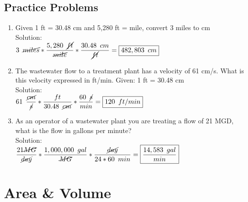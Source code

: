 \documentclass{article}
\begin{document}
\subsection{Practice Problems} 
\begin{enumerate}
\item Given 1 ft = 30.48 cm and 5,280 ft = mile, convert 3 miles to cm\\
Solution:\\
$3 \enspace \cancel{miles} * \dfrac{5,280 \enspace \cancel{ft}}{\cancel{mile}}*\dfrac{30.48 \enspace cm}{\cancel{ft}}=\boxed{482,803 \enspace cm}$

\item The wastewater flow to a treatment plant has a velocity of 61 cm/s. What is this velocity expressed in ft/min. Given: 1 ft = 30.48 cm\\
Solution:\\
$61 \enspace \dfrac{\cancel{cm}}{\cancel{s}} * \dfrac{ft}{30.48 \enspace \cancel{cm}}* \dfrac{60 \enspace \cancel{s}}{min} =  \boxed{120 \enspace ft/min}$\\

\item As an operator of a wastewater plant you are treating a flow of 21 MGD, what is the flow in gallons per minute?\\
Solution:\\
$\dfrac{21 \cancel{MG}}{\cancel{day}}*\dfrac{1,000,000 \enspace gal}{\cancel{MG}}*\dfrac{\cancel{day}}{24*60 \enspace min}=\boxed{\dfrac{14,583 \enspace gal}{min}}$\\
\end{enumerate}

\newpage

\section{Area \& Volume}

 
\end{document}
